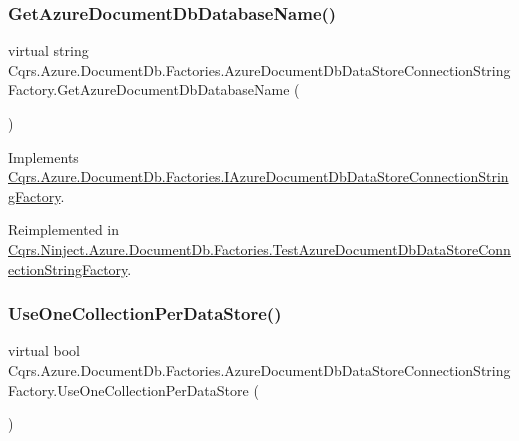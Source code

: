 \subsubsection{\texorpdfstring{Get\+Azure\+Document\+Db\+Database\+Name()}{GetAzureDocumentDbDatabaseName()}}
{\footnotesize\ttfamily virtual string Cqrs.\+Azure.\+Document\+Db.\+Factories.\+Azure\+Document\+Db\+Data\+Store\+Connection\+String\+Factory.\+Get\+Azure\+Document\+Db\+Database\+Name (\begin{DoxyParamCaption}{ }\end{DoxyParamCaption})\hspace{0.3cm}{\ttfamily [virtual]}}



Implements \hyperlink{interfaceCqrs_1_1Azure_1_1DocumentDb_1_1Factories_1_1IAzureDocumentDbDataStoreConnectionStringFactory_aa5e3d0920e86a97aef18f4f215ce4f88_aa5e3d0920e86a97aef18f4f215ce4f88}{Cqrs.\+Azure.\+Document\+Db.\+Factories.\+I\+Azure\+Document\+Db\+Data\+Store\+Connection\+String\+Factory}.



Reimplemented in \hyperlink{classCqrs_1_1Ninject_1_1Azure_1_1DocumentDb_1_1Factories_1_1TestAzureDocumentDbDataStoreConnectionStringFactory_ab4b864396b790819609d3337dfb3f75d_ab4b864396b790819609d3337dfb3f75d}{Cqrs.\+Ninject.\+Azure.\+Document\+Db.\+Factories.\+Test\+Azure\+Document\+Db\+Data\+Store\+Connection\+String\+Factory}.

\mbox{\label{classCqrs_1_1Azure_1_1DocumentDb_1_1Factories_1_1AzureDocumentDbDataStoreConnectionStringFactory_a736e0967785b1391ec21989a3f005c01_a736e0967785b1391ec21989a3f005c01}} 
\subsubsection{\texorpdfstring{Use\+One\+Collection\+Per\+Data\+Store()}{UseOneCollectionPerDataStore()}}
{\footnotesize\ttfamily virtual bool Cqrs.\+Azure.\+Document\+Db.\+Factories.\+Azure\+Document\+Db\+Data\+Store\+Connection\+String\+Factory.\+Use\+One\+Collection\+Per\+Data\+Store (\begin{DoxyParamCaption}{ }\end{DoxyParamCaption})\hspace{0.3cm}{\ttfamily [virtual]}}



